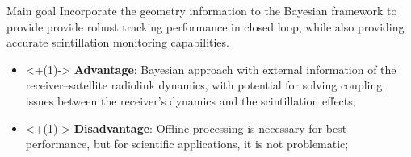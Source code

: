 \documentclass[
    hyperref={colorlinks,citecolor=DeepPink4,linkcolor=DarkRed,urlcolor=DarkBlue}
]{beamer_class}
\begin{document}
\begin{frame}[c]
	\vspace{6pt}

	\begin{alertblock}{Main goal}
        Incorporate the geometry information to the Bayesian framework to provide provide robust tracking performance in closed loop, while also providing accurate scintillation monitoring capabilities.
    \end{alertblock}

    \begin{itemize}
        \item<+(1)-> \textbf{Advantage}: Bayesian approach with external information of the receiver--satellite radiolink dynamics, with potential for solving coupling issues between the receiver's dynamics and the scintillation effects;
        \item<+(1)-> \textbf{Disadvantage}: Offline processing is necessary for best performance, but for scientific applications, it is not problematic;
    \end{itemize}
\end{frame}
\end{document}
